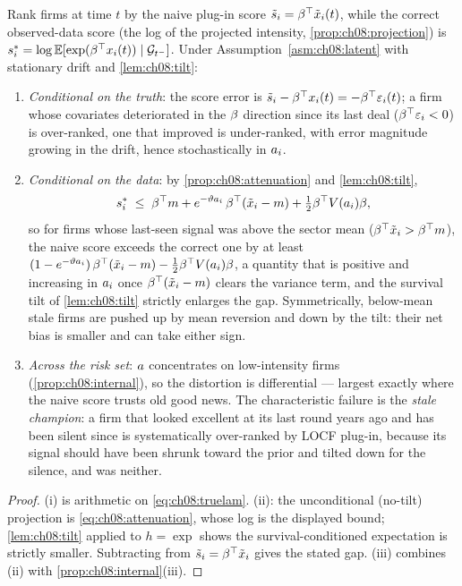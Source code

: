 \begin{proposition}
\label{prop:ch08:ranking}
Rank firms at time $t$ by the naive plug-in score $\tilde s_i =
\beta^{\top}\tilde{x}_i(t)$, while the correct observed-data score (the
log of the projected intensity, \cref{prop:ch08:projection}) is $s_i^* =
\log\mathbb{E}[\exp(\beta^{\top}x_i(t)) \mid \mathcal{G}_{t^-}]$. Under
Assumption~\ref{asm:ch08:latent} with stationary drift and \cref{lem:ch08:tilt}:
\begin{enumerate}[label=(\roman*)]
\item \emph{Conditional on the truth}: the score error is $\tilde s_i -
\beta^{\top}x_i(t) = -\beta^{\top}\varepsilon_i(t)$; a firm whose covariates
deteriorated in the $\beta$ direction since its last deal
($\beta^{\top}\varepsilon_i < 0$) is over-ranked, one that improved is
under-ranked, with error magnitude growing in the drift, hence
stochastically in $a_i$.
\item \emph{Conditional on the data}: by
\cref{prop:ch08:attenuation} and \cref{lem:ch08:tilt},
\[
s_i^*
 \;\le\;
 \beta^{\top} m + e^{-\vartheta a_i}\,\beta^{\top}(\tilde{x}_i - m)
 + \tfrac12\beta^{\top} V(a_i)\beta ,
\]
so for firms whose last-seen signal was above the sector mean
($\beta^{\top}\tilde{x}_i > \beta^{\top} m$), the naive score exceeds the
correct one by at least
$(1 - e^{-\vartheta a_i})\,\beta^{\top}(\tilde{x}_i - m)
- \tfrac12\beta^{\top} V(a_i)\beta$, a quantity that is positive
and increasing in $a_i$ once
$\beta^{\top}(\tilde{x}_i - m)$ clears the variance term, and the survival
tilt of \cref{lem:ch08:tilt} strictly enlarges the gap. Symmetrically,
below-mean stale firms are pushed up by mean reversion and down by the
tilt: their net bias is smaller and can take either sign.
\item \emph{Across the risk set}: $a$ concentrates on
low-intensity firms (\cref{prop:ch08:internal}), so the distortion is
differential --- largest exactly where the naive score trusts old good
news. The characteristic failure is the \emph{stale champion}: a firm
that looked excellent at its last round years ago and has been silent
since is systematically over-ranked by LOCF plug-in, because its signal
should have been shrunk toward the prior and tilted down for the
silence, and was neither.
\end{enumerate}
\end{proposition}

\begin{proof}
(i) is arithmetic on \cref{eq:ch08:truelam}. (ii): the unconditional
(no-tilt) projection is \cref{eq:ch08:attenuation}, whose log is the
displayed bound; \cref{lem:ch08:tilt} applied to $h = \exp$ shows the
survival-conditioned expectation is strictly smaller. Subtracting from
$\tilde s_i = \beta^{\top}\tilde{x}_i$ gives the stated gap. (iii) combines
(ii) with \cref{prop:ch08:internal}(iii).
\end{proof}

